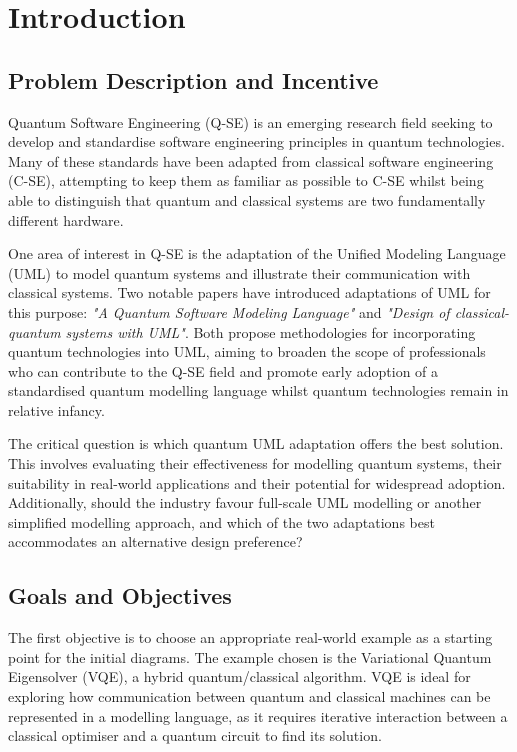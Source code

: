 \documentclass{article}
\begin{document}
\tableofcontents

\newpage

\section{Introduction}

\subsection{Problem Description and Incentive}

Quantum Software Engineering (Q-SE) is an emerging research field seeking to develop and standardise software engineering principles in quantum technologies. Many of these standards have been adapted from classical software engineering (C-SE), attempting to keep them as familiar as possible to C-SE whilst being able to distinguish that quantum and classical systems are two fundamentally different hardware. 

One area of interest in Q-SE is the adaptation of the Unified Modeling Language (UML) to model quantum systems and illustrate their communication with classical systems. Two notable papers have introduced adaptations of UML for this purpose: \textit{"A Quantum Software Modeling Language"}\cite{Pérez-Delgado2022} and \textit{"Design of classical-quantum systems with UML"}\cite{Pérez-Castillo2022}. Both propose methodologies for incorporating quantum technologies into UML, aiming to broaden the scope of professionals who can contribute to the Q-SE field and promote early adoption of a standardised quantum modelling language whilst quantum technologies remain in relative infancy. 

The critical question is which quantum UML adaptation offers the best solution. This involves evaluating their effectiveness for modelling quantum systems, their suitability in real-world applications and their potential for widespread adoption. Additionally, should the industry favour full-scale UML modelling or another simplified modelling approach, and which of the two adaptations best accommodates an alternative design preference?

\subsection{Goals and Objectives}

The first objective is to choose an appropriate real-world example as a starting point for the initial diagrams. The example chosen is the Variational Quantum Eigensolver (VQE), a hybrid quantum/classical algorithm. VQE is ideal for exploring how communication between quantum and classical machines can be represented in a modelling language, as it requires iterative interaction between a classical optimiser and a quantum circuit to find its solution. 
\end{document}
